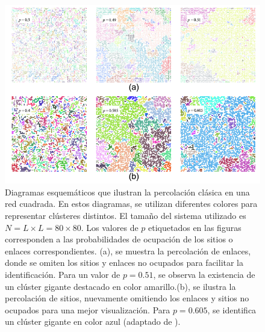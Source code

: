   

\begin{figure}[h!]
	\centering\includegraphics[width=\imsize]{percolacion_enlaces_sitios.png}
	\caption[Diagramas esquemáticos que ilustran la percolación clásica en una red cuadrada.]{Diagramas esquemáticos que ilustran la percolación clásica en una red cuadrada. En estos diagramas, se utilizan diferentes colores para representar clústeres distintos. El tamaño del sistema utilizado es $N = L \times L = 80 \times 80$. Los valores de $p$ etiquetados en las figuras corresponden a las probabilidades de ocupación de los sitios o enlaces correspondientes. (a), se muestra la percolación de enlaces, donde se omiten los sitios y enlaces no ocupados para facilitar la identificación. Para un valor de $p = 0.51$, se observa la existencia de un clúster gigante destacado en color amarillo.(b), se ilustra la percolación de sitios, nuevamente omitiendo los enlaces y sitios no ocupados para una mejor visualización. Para $p = 0.605$, se identifica un clúster gigante en color azul (adaptado de \protect\cite{li_percolation_2021}).}\label{fig:percolacion_enlaces_sitios}
\end{figure}


